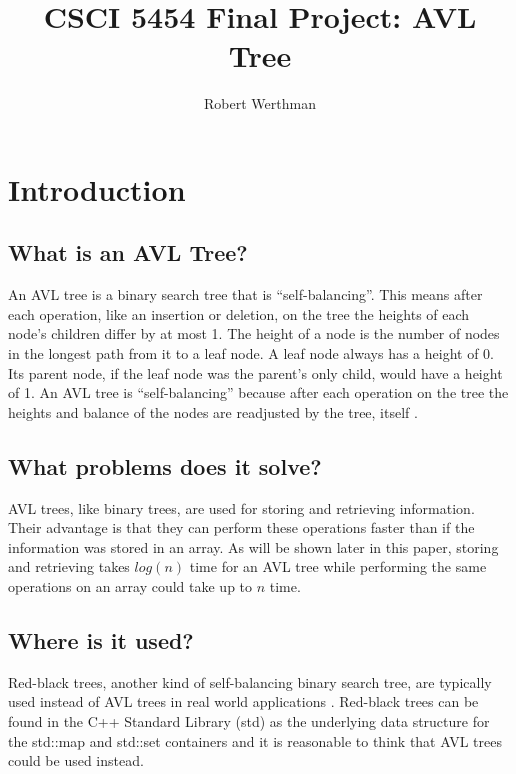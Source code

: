 \documentclass[12pt]{article}
\title{CSCI 5454 Final Project: AVL Tree}
\author{Robert Werthman}
\date{}
\begin{document}
\maketitle

\newpage
\tableofcontents

\newpage
{}
\section*{Introduction}

\subsection*{What is an AVL Tree?}

An AVL tree is a binary search tree that is ``self-balancing''.  This means
after each operation, like an insertion or deletion, on the tree the heights of 
each node's children differ by at most 1.  The height of a node is the number of
nodes in the longest path from it to a leaf node.  A leaf node
always has a height of 0. Its parent node, if the leaf
node was the parent's only child, would have a height of 1.  An AVL tree is
``self-balancing'' because after each operation on the tree the heights and balance of the nodes are readjusted by the tree,
itself \cite{wiki:avl}.

\subsection*{What problems does it solve?}
AVL trees, like binary trees, are used for storing and retrieving
information.  Their advantage is that they can perform these operations faster
than if the information was stored in an array.  As will be shown later in this
paper, storing and retrieving takes $log(n)$ time for an AVL tree
while performing the same operations on an array could take up to $n$ time.

\subsection*{Where is it used?}
Red-black trees, another kind of self-balancing binary search tree, are
typically used instead of AVL trees in real world applications
\cite{wiki:red-black}.
Red-black trees can be found in the C++ Standard Library (std) as the underlying data structure
for the std::map and std::set containers and it is reasonable to think that AVL
trees could be used instead.
\end{document}

